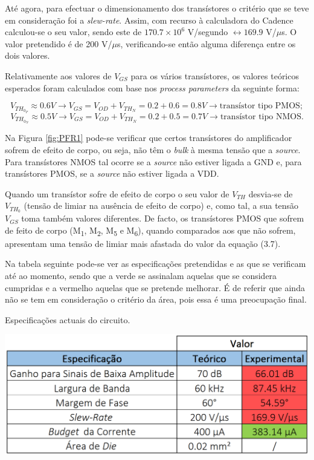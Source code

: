\documentclass[11pt]{article}
\numberwithin{equation}{section}
\begin{document}
Até agora, para efectuar o dimensionamento dos transístores o critério que se teve em consideração foi a \textit{slew-rate}. Assim, com recurso à calculadora do Cadence calculou-se o seu valor, sendo este de $170.7\times10^6$ V/segundo $\leftrightarrow 169.9$ V/$\mu$s. O valor pretendido é de 200 V/$\mu$s, verificando-se então alguma diferença entre os dois valores.

Relativamente aos valores de $V_{GS}$ para os vários transístores, os valores teóricos esperados foram calculados com base nos \textit{process parameters} da seguinte forma:

\vspace{-6mm}
\begin{equation}
V_{TH_{0_{P}}} \approx 0.6 V \rightarrow V_{GS} = V_{OD} + V_{TH_{N}} = 0.2 + 0.6 = 0.8 V \rightarrow \text{transístor tipo PMOS};
\end{equation}
\begin{equation}
V_{TH_{0_{N}}} \approx 0.5 V \rightarrow V_{GS} = V_{OD} + V_{TH_{N}} = 0.2 + 0.5 = 0.7 V \rightarrow \text{transístor tipo NMOS}.
\end{equation}

\vspace{1mm}
Na Figura \ref{fig:PFR1} pode-se verificar que certos transístores do amplificador sofrem de efeito de corpo, ou seja, não têm o \textit{bulk} à mesma tensão que a \textit{source}. Para transístores NMOS tal ocorre se a \textit{source} não estiver ligada a GND e, para transístores PMOS, se a \textit{source} não estiver ligada a VDD.

Quando um transístor sofre de efeito de corpo o seu valor de $V_{TH}$ desvia-se de $V_{TH_{0}}$ (tensão de limiar na ausência de efeito de corpo) e, como tal, a sua tensão $V_{GS}$ toma também valores diferentes. De facto, os transístores PMOS que sofrem de feito de corpo (M\textsubscript{1}, M\textsubscript{2}, M\textsubscript{5} e M\textsubscript{6}), quando comparados aos que não sofrem, apresentam uma tensão de limiar mais afastada do valor da equação (3.7).

Na tabela seguinte pode-se ver as especificações pretendidas e as que se verificam até ao momento, sendo que a verde se assinalam aquelas que se considera cumpridas e a vermelho aquelas que se pretende melhorar. É de referir que ainda não se tem em consideração o critério da área, pois essa é uma preocupação final.

\begin{table}[H]
	\centering
	\caption{Especificações actuais do circuito.}
	\vspace{-1.5mm}
	\includegraphics[keepaspectratio=true, scale=0.40]{teoricas/valoresoriginais}
\end{table}
\end{document}
